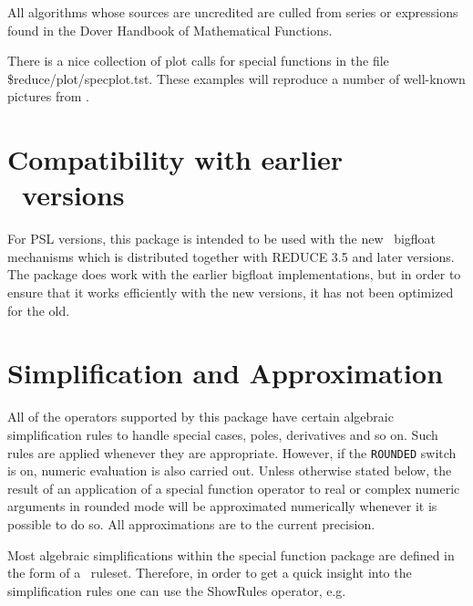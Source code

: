 All algorithms whose sources are uncredited are culled from series or
expressions found in the Dover Handbook of Mathematical
Functions\cite{Abramowitz:72}.

There is a nice collection of plot calls for special functions
in the file \$reduce/plot/specplot.tst. 
These examples will reproduce a number of well-known pictures from
\cite{Abramowitz:72}.

\section{Compatibility with earlier \REDUCE\ versions}

For {PSL} versions,
this package is intended to be used with the new \REDUCE\ bigfloat
mechanisms which is distributed together with REDUCE 3.5 and later versions.
The package does work with the earlier bigfloat implementations,
but in order to 
ensure that it works efficiently with the new versions, it has not been
optimized for the old.

\section{Simplification and Approximation}

All of the operators supported by this package have certain algebraic
simplification rules to handle special cases, poles, derivatives and so
on.  Such rules are applied whenever they are appropriate.  However, if
the {\tt ROUNDED} switch is on, numeric evaluation is also carried out.
Unless otherwise stated below, the result of an application of a special
function operator to real or complex numeric arguments in rounded mode
will be approximated numerically whenever it is possible to do so.  All
approximations are to the current precision.

Most algebraic simplifications within the special function package 
are defined in the form of a \REDUCE\ ruleset. Therefore, in order to
get a quick insight into the simplification rules one can use the
ShowRules operator, e.g.\\

